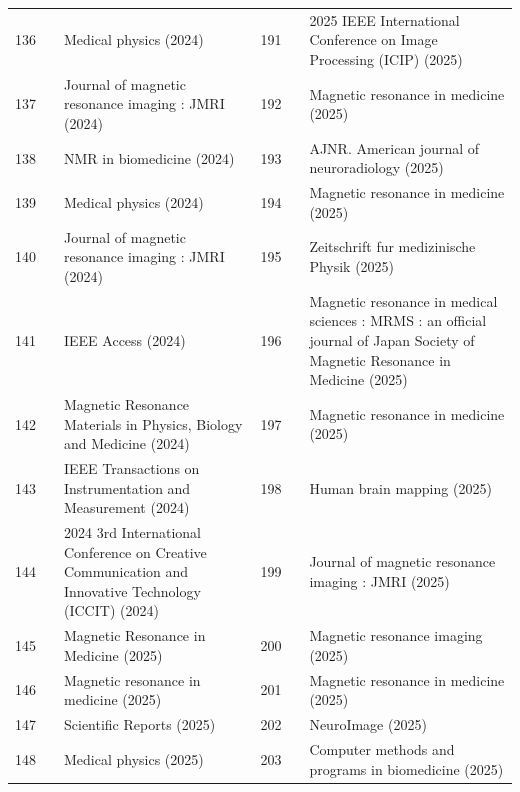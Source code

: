\documentclass[11pt]{article}
\begin{document}
{\begin{longtable}{r l p{} r l p{}}
136 & \cite{yuan2024novel} & Medical physics (2024) & 191 & \cite{alalar2025sparsitydriven} & 2025 IEEE International Conference on Image Processing (ICIP) (2025) \\
137 & \cite{wada2024deep} & Journal of magnetic resonance imaging : JMRI (2024) & 192 & \cite{wang2025spherical} & Magnetic resonance in medicine (2025) \\
138 & \cite{hewlett2024deep} & NMR in biomedicine (2024) & 193 & \cite{dewey2025superresolution} & AJNR. American journal of neuroradiology (2025) \\
139 & \cite{xie2024based} & Medical physics (2024) & 194 & \cite{liu2025timeefficient} & Magnetic resonance in medicine (2025) \\
140 & \cite{moshe2024handling} & Journal of magnetic resonance imaging : JMRI (2024) & 195 & \cite{bauman2025ultrahighresolution} & Zeitschrift fur medizinische Physik (2025) \\
141 & \cite{desalegn2024hara} & IEEE Access (2024) & 196 & \cite{muro2025using} & Magnetic resonance in medical sciences : MRMS : an official journal of Japan Society of Magnetic Resonance in Medicine (2025) \\
142 & \cite{yarach2024reconstruction} & Magnetic Resonance Materials in Physics, Biology and Medicine (2024) & 197 & \cite{wang2025variableflipangle} & Magnetic resonance in medicine (2025) \\
143 & \cite{shan2024image} & IEEE Transactions on Instrumentation and Measurement (2024) & 198 & \cite{rauland2025white} & Human brain mapping (2025) \\
144 & \cite{ismail2024performance} & 2024 3rd International Conference on Creative Communication and Innovative Technology (ICCIT) (2024) & 199 & \cite{wu2025application} & Journal of magnetic resonance imaging : JMRI (2025) \\
145 & \cite{milovic2024xsim} & Magnetic Resonance in Medicine (2025) & 200 & \cite{sakitis2025bayesian} & Magnetic resonance imaging (2025) \\
146 & \cite{feizollah2025d} & Magnetic resonance in medicine (2025) & 201 & \cite{brunatova2025denoising} & Magnetic resonance in medicine (2025) \\
147 & \cite{won2025a} & Scientific Reports (2025) & 202 & \cite{lan2025diffusion} & NeuroImage (2025) \\
148 & \cite{safari2025a} & Medical physics (2025) & 203 & \cite{huijben2025enhancing} & Computer methods and programs in biomedicine (2025) \\

\end{longtable}}
\end{document}
